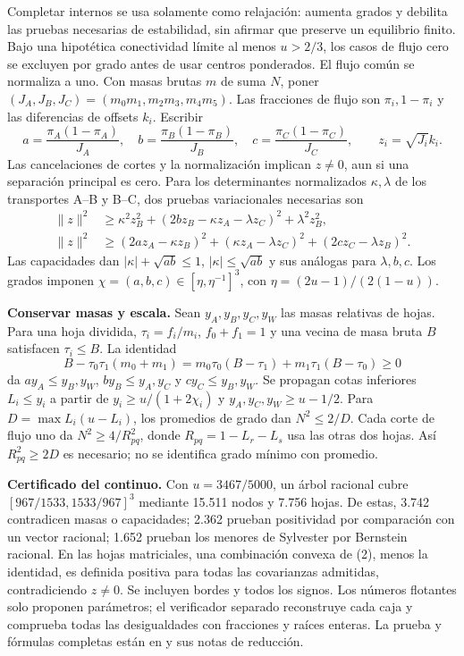 \documentclass[10pt,a4paper]{article}
\begin{document}
Completar internos se usa solamente como relajación: aumenta grados y debilita las pruebas necesarias de estabilidad, sin afirmar que preserve un equilibrio finito. Bajo una hipotética conectividad límite al menos $u>2/3$, los casos de flujo cero se excluyen por grado antes de usar centros ponderados. El flujo común se normaliza a uno. Con masas brutas $m$ de suma $N$, poner $(J_A,J_B,J_C)=(m_0m_1,m_2m_3,m_4m_5)$. Las fracciones de flujo son $\pi_i,1-\pi_i$ y las diferencias de offsets $k_i$. Escribir
\[
 a=\frac{\pi_A(1-\pi_A)}{J_A},\quad
 b=\frac{\pi_B(1-\pi_B)}{J_B},\quad
 c=\frac{\pi_C(1-\pi_C)}{J_C},\qquad z_i=\sqrt{J_i}k_i.
\]
Las cancelaciones de cortes y la normalización implican $z\ne0$, aun si una separación principal es cero. Para los determinantes normalizados $\kappa,\lambda$ de los transportes A--B y B--C, dos pruebas variacionales necesarias son
\[
\begin{aligned}
 \|z\|^2&\geq\kappa^2z_B^2+(2bz_B-\kappa z_A-\lambda z_C)^2+\lambda^2z_B^2,\\
 \|z\|^2&\geq(2az_A-\kappa z_B)^2+(\kappa z_A-\lambda z_C)^2+(2cz_C-\lambda z_B)^2.
\end{aligned}\tag{2}
\]
Las capacidades dan $|\kappa|+\sqrt{ab}\leq1$, $|\kappa|\leq\sqrt{ab}$ y sus análogas para $\lambda,b,c$. Los grados imponen $\chi=(a,b,c)\in[\eta,\eta^{-1}]^3$, con $\eta=(2u-1)/(2(1-u))$.

\textbf{Conservar masas y escala.} Sean $y_A,y_B,y_C,y_W$ las masas relativas de hojas. Para una hoja dividida, $\tau_i=f_i/m_i$, $f_0+f_1=1$ y una vecina de masa bruta $B$ satisfacen $\tau_i\leq B$. La identidad
\[
 B-\tau_0\tau_1(m_0+m_1)
 =m_0\tau_0(B-\tau_1)+m_1\tau_1(B-\tau_0)\geq0
\]
da $ay_A\leq y_B,y_W$, $by_B\leq y_A,y_C$ y $cy_C\leq y_B,y_W$. Se propagan cotas inferiores $L_i\leq y_i$ a partir de $y_i\geq u/(1+2\chi_i)$ y $y_A,y_C,y_W\geq u-1/2$. Para $D=\max L_i(u-L_i)$, los promedios de grado dan $N^2\leq2/D$. Cada corte de flujo uno da $N^2\geq4/R_{pq}^2$, donde $R_{pq}=1-L_r-L_s$ usa las otras dos hojas. Así $R_{pq}^2\geq2D$ es necesario; no se identifica grado mínimo con promedio.

\textbf{Certificado del continuo.} Con $u=3467/5000$, un árbol racional cubre $[967/1533,1533/967]^3$ mediante 15.511 nodos y 7.756 hojas. De estas, 3.742 contradicen masas o capacidades; 2.362 prueban positividad por comparación con un vector racional; 1.652 prueban los menores de Sylvester por Bernstein racional. En las hojas matriciales, una combinación convexa de (2), menos la identidad, es definida positiva para todas las covarianzas admitidas, contradiciendo $z\ne0$. Se incluyen bordes y todos los signos. Los números flotantes solo proponen parámetros; el verificador separado reconstruye cada caja y comprueba todas las desigualdades con fracciones y raíces enteras. La prueba y fórmulas completas están en  y sus notas de reducción.
\end{document}
